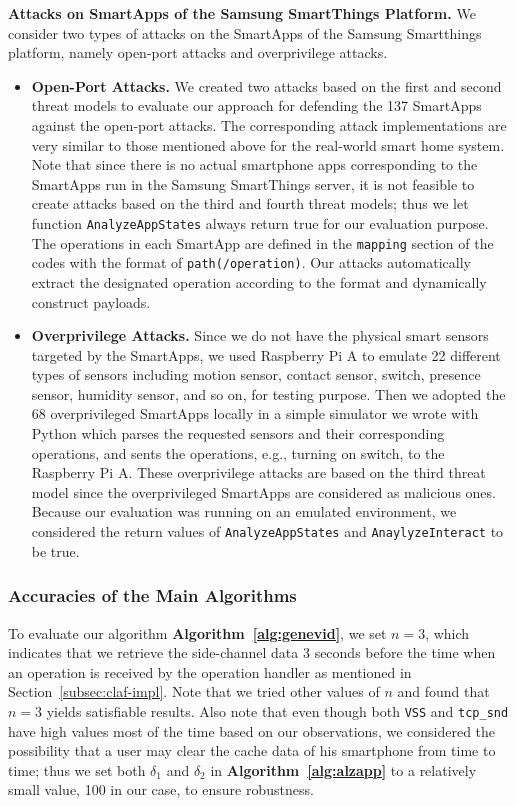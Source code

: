 \documentclass[letterpaper,12pt]{article}
\begin{document}
\textbf{Attacks on SmartApps of the Samsung SmartThings Platform.} 
We consider two types of attacks on the SmartApps of the Samsung Smartthings platform, namely open-port attacks and overprivilege attacks.
\begin{itemize}

\item \textbf{Open-Port Attacks.}  We created two attacks based on the first and second threat models to evaluate our approach for defending the 137 SmartApps against the open-port attacks. The corresponding attack implementations are very similar to those mentioned above for the real-world smart home system. Note that since there is no actual smartphone apps corresponding to the SmartApps run in the Samsung SmartThings server, it is not feasible to create attacks based on the third and fourth threat models; thus we let function \texttt{AnalyzeAppStates} always return true for our evaluation purpose. The operations in each SmartApp are defined in the \texttt{mapping} section of the codes with the format of \texttt{path(/operation)}. Our attacks automatically extract the designated operation according to the format and dynamically construct payloads.

\item \textbf{Overprivilege Attacks.} Since we do not have the physical smart sensors targeted by the SmartApps, we used Raspberry Pi A to emulate 22 different types of sensors including motion sensor, contact sensor, switch, presence sensor, humidity sensor, and so on, for testing purpose. Then we adopted the 68 overprivileged SmartApps locally in a simple simulator we wrote with Python which parses the requested sensors and their corresponding operations, and sents the operations, e.g., turning on switch, to the Raspberry Pi A. These overprivilege attacks are based on the third threat model since the overprivileged SmartApps are considered as malicious ones. Because our evaluation was running on an emulated environment, we considered the return values of \texttt{AnalyzeAppStates} and \texttt{AnaylyzeInteract} to be true.

\end{itemize}

\subsubsection{Accuracies of the Main Algorithms}
To evaluate our algorithm {\bf Algorithm~\ref{alg:genevid}}, we set $n=3$, which indicates that we retrieve the side-channel data 3 seconds before the time when an operation is received by the operation handler as mentioned in Section~\ref{subsec:claf-impl}. Note that we tried other values of $n$ and found that $n=3$ yields satisfiable results. Also note that even though both \texttt{VSS} and \texttt{tcp\_snd} have high values most of the time based on our observations, we considered the possibility that a user may clear the cache data of his smartphone from time to time; thus we set both $\delta_1$ and $\delta_2$ in {\bf Algorithm~\ref{alg:alzapp}} to a relatively small value, 100 in our case, to ensure robustness.
\end{document}
